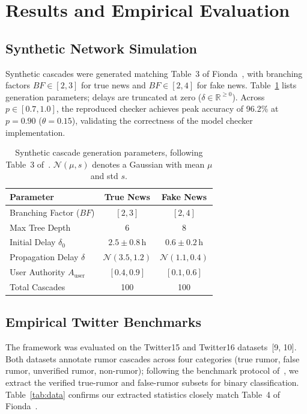 \documentclass[10pt,twocolumn,a4paper]{article}
\begin{document}
\section{Results and Empirical Evaluation}
\subsection{Synthetic Network Simulation}
Synthetic cascades were generated matching Table~3 of Fionda~\cite{fionda2025}, with branching factors $BF\in[2,3]$ for true news and $BF\in[2,4]$ for fake news. Table~\ref{tab:synth} lists generation parameters; delays are truncated at zero ($\delta \in \mathbb{R}^{\ge 0}$). Across $p\in[0.7,1.0]$, the reproduced checker achieves peak accuracy of 96.2\% at $p=0.90$ ($\theta=0.15$), validating the correctness of the model checker implementation.
 
\begin{table}[t]
\centering
\caption{Synthetic cascade generation parameters, following Table~3 of~\cite{fionda2025}. $\mathcal{N}(\mu, s)$ denotes a Gaussian with mean $\mu$ and std $s$.}
\label{tab:synth}
\footnotesize
\setlength{\tabcolsep}{4pt}
\begin{tabular}{lcc}
\toprule
Parameter & True News & Fake News\\
\midrule
Branching Factor ($BF$) & $[2,3]$ & $[2,4]$\\
Max Tree Depth & 6 & 8\\
Initial Delay $\delta_0$ & $2.5\pm0.8$\,h & $0.6\pm0.2$\,h\\
Propagation Delay $\delta$ & $\mathcal{N}(3.5,1.2)$ & $\mathcal{N}(1.1,0.4)$\\
User Authority $A_{\mathrm{user}}$ & $[0.4,0.9]$ & $[0.1,0.6]$\\
Total Cascades & 100 & 100\\
\bottomrule
\end{tabular}
\end{table}
 
\subsection{Empirical Twitter Benchmarks}
The framework was evaluated on the Twitter15 and Twitter16 datasets~[9, 10]. Both datasets annotate rumor cascades across four categories (true rumor, false rumor, unverified rumor, non-rumor); following the benchmark protocol of~\cite{fionda2025}, we extract the verified true-rumor and false-rumor subsets for binary classification. Table~\ref{tab:data} confirms our extracted statistics closely match Table~4 of Fionda~\cite{fionda2025}.
 
\end{document}
